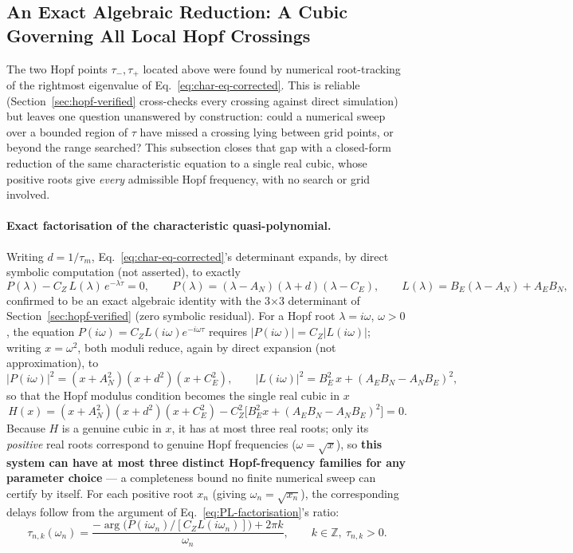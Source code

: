 \documentclass[twocolumn,10pt]{article}
\begin{document}
\subsection{An Exact Algebraic Reduction: A Cubic Governing All Local Hopf Crossings}
\label{sec:exact-cubic}
The two Hopf points $\tau_-,\tau_+$ located above were found by numerical root-tracking of the rightmost eigenvalue of Eq.~\eqref{eq:char-eq-corrected}. This is reliable (Section~\ref{sec:hopf-verified} cross-checks every crossing against direct simulation) but leaves one question unanswered by construction: could a numerical sweep over a bounded region of $\tau$ have missed a crossing lying between grid points, or beyond the range searched? This subsection closes that gap with a closed-form reduction of the same characteristic equation to a single real cubic, whose positive roots give \emph{every} admissible Hopf frequency, with no search or grid involved.

\paragraph{Exact factorisation of the characteristic quasi-polynomial.} Writing $d=1/\tau_m$, Eq.~\eqref{eq:char-eq-corrected}'s determinant expands, by direct symbolic computation (not asserted), to exactly
\begin{equation}
P(\lambda) - C_Z\,L(\lambda)\,e^{-\lambda\tau} = 0, \qquad
P(\lambda) = (\lambda-A_N)(\lambda+d)(\lambda-C_E), \qquad
L(\lambda) = B_E(\lambda-A_N) + A_E B_N,
\label{eq:PL-factorisation}
\end{equation}
confirmed to be an exact algebraic identity with the 3$\times$3 determinant of Section~\ref{sec:hopf-verified} (zero symbolic residual). For a Hopf root $\lambda=i\omega$, $\omega>0$, the equation $P(i\omega)=C_Z L(i\omega)e^{-i\omega\tau}$ requires $|P(i\omega)|=C_Z|L(i\omega)|$; writing $x=\omega^2$, both moduli reduce, again by direct expansion (not approximation), to
\begin{equation}
|P(i\omega)|^2 = (x+A_N^2)(x+d^2)(x+C_E^2), \qquad
|L(i\omega)|^2 = B_E^2\,x + (A_E B_N - A_N B_E)^2,
\label{eq:modulus-formulas}
\end{equation}
so that the Hopf modulus condition becomes the single real cubic in $x$
\begin{equation}
\boxed{\,H(x) = (x+A_N^2)(x+d^2)(x+C_E^2) - C_Z^2\bigl[B_E^2 x + (A_E B_N - A_N B_E)^2\bigr] = 0.\,}
\label{eq:hopf-cubic}
\end{equation}
Because $H$ is a genuine cubic in $x$, it has at most three real roots; only its \emph{positive} real roots correspond to genuine Hopf frequencies ($\omega=\sqrt{x}$), so \textbf{this system can have at most three distinct Hopf-frequency families for any parameter choice} — a completeness bound no finite numerical sweep can certify by itself. For each positive root $x_n$ (giving $\omega_n=\sqrt{x_n}$), the corresponding delays follow from the argument of Eq.~\eqref{eq:PL-factorisation}'s ratio:
\begin{equation}
\tau_{n,k}(\omega_n) = \frac{-\arg\!\bigl(P(i\omega_n)/[C_Z L(i\omega_n)]\bigr) + 2\pi k}{\omega_n}, \qquad k\in\mathbb Z,\ \tau_{n,k}>0.
\label{eq:hopf-tau-formula}
\end{equation}
\end{document}
